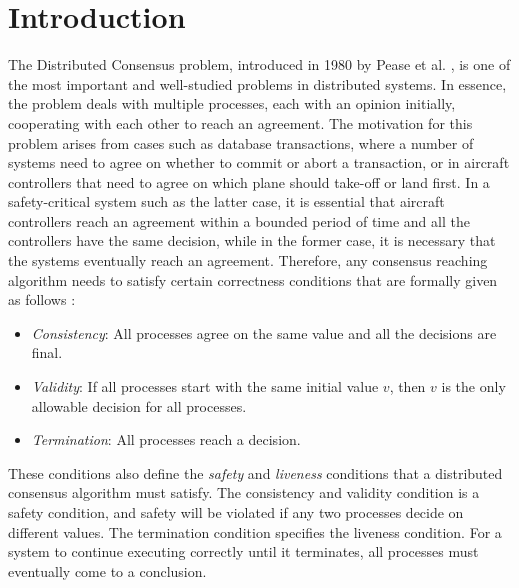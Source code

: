 ﻿\section{Introduction}

The Distributed Consensus problem, introduced in 1980 by Pease et al. \cite{PeaseSL80}, is one of the most important and well-studied problems in distributed systems. In essence, the problem deals with multiple processes, each with an opinion initially, cooperating with each other to reach an agreement. The motivation for this problem arises from cases such as database transactions, where a number of systems need to agree on whether to commit or abort a transaction, or in aircraft controllers that need to agree on which plane should take-off or land first. In a safety-critical system such as the latter case, it is essential that aircraft controllers reach an agreement within a bounded period of time and all the controllers have the same decision, while in the former case, it is necessary that the systems eventually reach an agreement. Therefore, any consensus reaching algorithm needs to satisfy certain correctness conditions that are formally given as follows \cite{PeaseSL80}:

\begin{itemize}
    \item \textit{Consistency}: All processes agree on the same value and all the decisions are final.
    \item \textit{Validity}: If all processes start with the same initial value $v$, then $v$ is the only allowable decision for all processes.
    \item \textit{Termination}: All processes reach a decision.
\end{itemize}


These conditions also define the \textit{safety} and \textit{liveness} conditions that a distributed consensus algorithm must satisfy.  The consistency and validity condition is a safety condition, and safety will be violated if any two processes decide on different values. The termination condition specifies the liveness condition. For a system to continue executing correctly until it terminates, all processes must eventually come to a conclusion.

